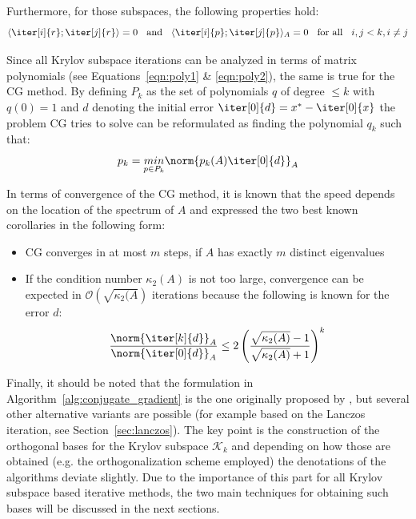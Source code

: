 \noindent Furthermore, for those subspaces, the following properties hold:
\begin{equation}
    \langle\iter[i]{r};\iter[j]{r}\rangle =0 \;\; \text{ and } \;\; \langle\iter[i]{p};\iter[j]{p}\rangle_A =0
    \;\; \text{ for all }\;\; i,j <k, i \neq j
\end{equation}

\noindent Since all Krylov subspace iterations can be analyzed in terms of matrix polynomials (see Equations~\hyperref[eqn:poly1]{\ref{eqn:poly1}} \& \hyperref[eqn:poly2]{\ref{eqn:poly2}}), the same is true for the CG method. By defining $P_k$ as the set of polynomials $q$ of degree $\leq k$ with $q(0)=1$ and $d$ denoting the initial error $\iter[0]{d} = x^*-\iter[0]{x}$ the problem CG tries to solve can be reformulated as finding the polynomial $q_k$ such that:
\begin{equation}
\label{eqn:cg_poly}
    p_k = \underset{p\in P_k}{min} \norm{p_k(A)\iter[0]{d}}_A
\end{equation}

\noindent In terms of convergence of the CG method, it is known that the speed depends on the location of the spectrum of $A$ and \cite{trefethen_numerical_1997} expressed the two best known corollaries in the following form:
\begin{itemize}
    \item CG converges in at most $m$ steps, if $A$ has exactly $m$ distinct eigenvalues
    \item If the condition number $\kappa_2(A) $ is not too large, convergence can be expected in $\mathcal{O}(\sqrt{\kappa_2(A})$ iterations because the following is known for the error $d$:
\begin{equation}
        \frac{\norm{\iter[k]{d}}_A}{\norm{\iter[0]{d}}_A} \leq 2 \left( \frac{\sqrt{\kappa_2(A)}-1}{\sqrt{\kappa_2(A)}+1}\right)^k
\end{equation}
\end{itemize}

\noindent Finally, it should be noted that the formulation in Algorithm~\hyperref[alg:conjugate_gradient]{\ref{alg:conjugate_gradient}} is the one originally proposed by \cite{hestenes_methods_1952}, but several other alternative variants are possible (for example based on the Lanczos iteration, see Section~\hyperref[sec:lanczos]{\ref{sec:lanczos}}). The key point is the construction of the orthogonal bases for the Krylov subspace $\mathcal{K}_k$ and depending on how those are obtained (e.g. the orthogonalization scheme employed) the denotations of the algorithms deviate slightly. Due to the importance of this part for all Krylov subspace based iterative methods, the two main techniques for obtaining such bases will be discussed in the next sections.


